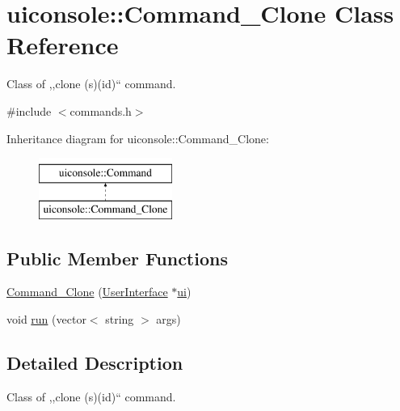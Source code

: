 \hypertarget{classuiconsole_1_1Command__Clone}{
\section{uiconsole::Command\_\-Clone Class Reference}
\label{df/d75/classuiconsole_1_1Command__Clone}
}


Class of ,,clone (s)(id)`` command.  




{\ttfamily \#include $<$commands.h$>$}

Inheritance diagram for uiconsole::Command\_\-Clone:\begin{figure}[H]
\begin{center}
\leavevmode
\includegraphics[height=2.000000cm]{df/d75/classuiconsole_1_1Command__Clone}
\end{center}
\end{figure}
\subsection*{Public Member Functions}
\begin{DoxyCompactItemize}
\item 
\hyperlink{classuiconsole_1_1Command__Clone_adad6880fe28570d5c4f8250798987c6d}{Command\_\-Clone} (\hyperlink{classUserInterface}{UserInterface} $\ast$\hyperlink{classuiconsole_1_1Command_ab43ed5152860c099f858d62f9f556699}{ui})
\item 
void \hyperlink{classuiconsole_1_1Command__Clone_af61cd935a174eaeeec06b98620afe6af}{run} (vector$<$ string $>$ args)
\end{DoxyCompactItemize}


\subsection{Detailed Description}
Class of ,,clone (s)(id)`` command. 

